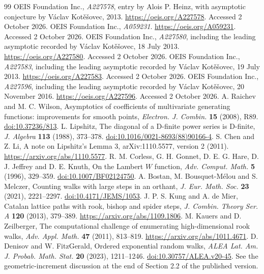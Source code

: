 \documentclass[11pt]{article}
\theoremstyle{remark}\newtheorem{remark}[theorem]{Remark}
\begin{document}
\begingroup\raggedright
\begin{thebibliography}{99}
 OEIS Foundation Inc., \emph{A227578}, entry by Alois P. Heinz, with asymptotic conjecture by V\'aclav Kot\v e\v sovec, 2013. \url{https://oeis.org/A227578}. Accessed 2 October 2026.
 OEIS Foundation Inc., \emph{A059231}. \url{https://oeis.org/A059231}. Accessed 2 October 2026.
 OEIS Foundation Inc., \emph{A227580}, including the leading asymptotic recorded by V\'aclav Kot\v e\v sovec, 18 July 2013. \url{https://oeis.org/A227580}. Accessed 2 October 2026.
 OEIS Foundation Inc., \emph{A227583}, including the leading asymptotic recorded by V\'aclav Kot\v e\v sovec, 19 July 2013. \url{https://oeis.org/A227583}. Accessed 2 October 2026.
 OEIS Foundation Inc., \emph{A227596}, including the leading asymptotic recorded by V\'aclav Kot\v e\v sovec, 20 November 2016. \url{https://oeis.org/A227596}. Accessed 2 October 2026.
 A. Raichev and M. C. Wilson, Asymptotics of coefficients of multivariate generating functions: improvements for smooth points, \emph{Electron. J. Combin.} \textbf{15} (2008), R89. \href{https://doi.org/10.37236/813}{doi:10.37236/813}.
 L. Lipshitz, The diagonal of a D-finite power series is D-finite, \emph{J. Algebra} \textbf{113} (1988), 373--378. \href{https://doi.org/10.1016/0021-8693(88)90166-4}{doi:10.1016/0021-8693(88)90166-4}.
 S. Chen and Z. Li, A note on Lipshitz's Lemma 3, arXiv:1110.5577, version 2 (2011). \url{https://arxiv.org/abs/1110.5577}.
 R. M. Corless, G. H. Gonnet, D. E. G. Hare, D. J. Jeffrey and D. E. Knuth, On the Lambert $W$ function, \emph{Adv. Comput. Math.} \textbf{5} (1996), 329--359. \href{https://doi.org/10.1007/BF02124750}{doi:10.1007/BF02124750}.
 A. Bostan, M. Bousquet-M\'elou and S. Melczer, Counting walks with large steps in an orthant, \emph{J. Eur. Math. Soc.} \textbf{23} (2021), 2221--2297. \href{https://doi.org/10.4171/JEMS/1053}{doi:10.4171/JEMS/1053}.
 J. P. S. Kung and A. de Mier, Catalan lattice paths with rook, bishop and spider steps, \emph{J. Combin. Theory Ser. A} \textbf{120} (2013), 379--389. \url{https://arxiv.org/abs/1109.1806}.
 M. Kauers and D. Zeilberger, The computational challenge of enumerating high-dimensional rook walks, \emph{Adv. Appl. Math.} \textbf{47} (2011), 813--819. \url{https://arxiv.org/abs/1011.4671}.
 D. Denisov and W. FitzGerald, Ordered exponential random walks, \emph{ALEA Lat. Am. J. Probab. Math. Stat.} \textbf{20} (2023), 1211--1246. \href{https://doi.org/10.30757/ALEA.v20-45}{doi:10.30757/ALEA.v20-45}. See the geometric-increment discussion at the end of Section 2.2 of the published version.

\end{thebibliography}
\end{document}

